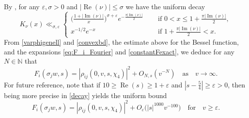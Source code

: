 \documentclass[12pt,reqno]{amsart}
\numberwithin{equation}{section}
\renewcommand{\Im}{\operatorname{Im}}
\renewcommand{\Re}{\operatorname{Re}}
\begin{document}
By \cite[Proposition 9]{HM06}, for any $\varepsilon, \sigma > 0$ and $|{\Re(\nu)}| \leq \sigma$ we have the uniform decay
\begin{equation}\label{eq:Bessel_general_bound}
    K_{\nu}(x) \ll_{\sigma, \varepsilon} 
    \begin{cases}
        \big( \frac{1 + |{\Im(\nu)}|}{x} \big)^{\sigma + \varepsilon} e^{-\frac{\pi |{\Im(\nu)}|}{2}} & \quad \text{ if } 0 < x \leq 1 + \frac{\pi |{\Im(\nu)}|}{2}, \\
        x^{-1/2} e^{-x} & \quad \text{ if } 1 + \frac{\pi |{\Im(\nu)}|}{2} < x. 
    \end{cases}
\end{equation}
From \eqref{varphigenell} and \eqref{convexbd}, the estimate above for the Bessel function, and the expansions \eqref{eq:F_i_Fourier} and \eqref{constantFexact}, we deduce for any $N \in \mathbb{N}$ that
\begin{equation} \label{decay}
    F_i(\sigma_{j}w, s) = |\rho_{i j}(0,v,s,\chi_4)|^2 + O_{N,s}(v^{-N}) \quad \text{as} \quad v \to \infty.
\end{equation}
For future reference, note that if $10 \geq \Re(s) \geq 1+\varepsilon$ and $|s - \frac{5}{4}| \geq \varepsilon>0$, then being more precise in \eqref{decay} yields the uniform bound
\begin{equation}\label{eq:essential_RS_bound}
    F_i(\sigma_{j}w, s) = |\rho_{i j}(0,v,s,\chi_4)|^2 + O_{\varepsilon}\big(|{s}|^{1000} v^{-100} \big) \quad \text{for} \quad v \geq \varepsilon.
\end{equation}
\end{document}
